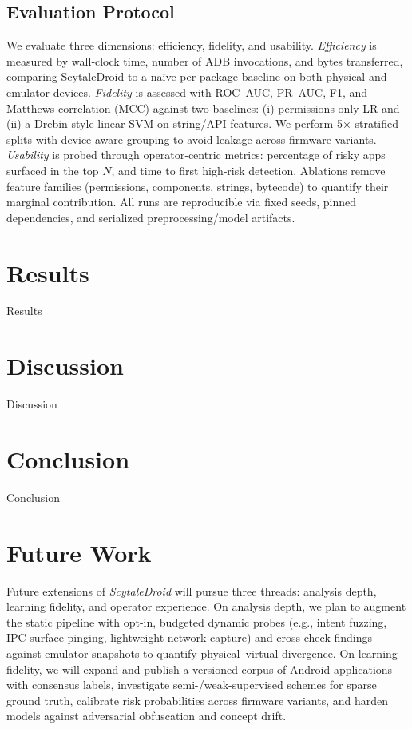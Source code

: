 \documentclass[10pt,conference]{IEEEtran}
\begin{document}
\subsection{Evaluation Protocol}
We evaluate three dimensions: efficiency, fidelity, and usability. \emph{Efficiency} is measured by wall‐clock time, number of ADB invocations, and bytes transferred, comparing ScytaleDroid to a naïve per‐package baseline on both physical and emulator devices. \emph{Fidelity} is assessed with ROC–AUC, PR–AUC, F1, and Matthews correlation (MCC) against two baselines: (i) permissions‐only LR and (ii) a Drebin‐style linear SVM on string/API features. We perform 5× stratified splits with device‐aware grouping to avoid leakage across firmware variants. \emph{Usability} is probed through operator‐centric metrics: percentage of risky apps surfaced in the top $N$, and time to first high‐risk detection. Ablations remove feature families (permissions, components, strings, bytecode) to quantify their marginal contribution. All runs are reproducible via fixed seeds, pinned dependencies, and serialized preprocessing/model artifacts.

\section{Results}\label{sec:results}
Results

\section{Discussion}\label{sec:discussion}

Discussion

\section{Conclusion}\label{sec:conclusion}

Conclusion

\section{Future Work}\label{futurework}

Future extensions of \emph{ScytaleDroid} will pursue three threads: analysis depth, learning fidelity, and operator experience. On analysis depth, we plan to augment the static pipeline with opt-in, budgeted dynamic probes (e.g., intent fuzzing, IPC surface pinging, lightweight network capture) and cross-check findings against emulator snapshots to quantify physical–virtual divergence. On learning fidelity, we will expand and publish a versioned corpus of Android applications with consensus labels, investigate semi-/weak-supervised schemes for sparse ground truth, calibrate risk probabilities across firmware variants, and harden models against adversarial obfuscation and concept drift.



\end{document}
